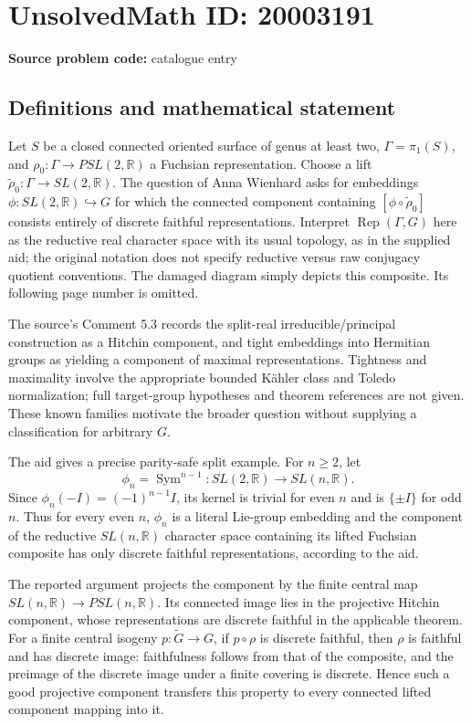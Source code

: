 \documentclass[11pt]{article}
\newcommand{\R}{\mathbb{R}}
\begin{document}
\section*{UnsolvedMath ID: 20003191}
\textbf{Source problem code:} catalogue entry
\subsection{Definitions and mathematical statement}
Let \(S\) be a closed connected oriented surface of genus at least two, \(\Gamma=\pi_1(S)\), and \(\rho_0:\Gamma\to PSL(2,\R)\) a Fuchsian representation. Choose a lift \(\widetilde\rho_0:\Gamma\to SL(2,\R)\). The question of Anna Wienhard asks for embeddings \(\phi:SL(2,\R)\hookrightarrow G\) for which the connected component containing \([\phi\circ\widetilde\rho_0]\) consists entirely of discrete faithful representations. Interpret \(\operatorname{Rep}(\Gamma,G)\) here as the reductive real character space with its usual topology, as in the supplied aid; the original notation does not specify reductive versus raw conjugacy quotient conventions. The damaged diagram simply depicts this composite. Its following page number is omitted.

The source's Comment 5.3 records the split-real irreducible/principal construction as a Hitchin component, and tight embeddings into Hermitian groups as yielding a component of maximal representations. Tightness and maximality involve the appropriate bounded K\"ahler class and Toledo normalization; full target-group hypotheses and theorem references are not given. These known families motivate the broader question without supplying a classification for arbitrary \(G\).

The aid gives a precise parity-safe split example. For \(n\ge2\), let
\[
\phi_n=\operatorname{Sym}^{n-1}:SL(2,\R)\longrightarrow SL(n,\R).
\]
Since \(\phi_n(-I)=(-1)^{n-1}I\), its kernel is trivial for even \(n\) and is \(\{\pm I\}\) for odd \(n\). Thus for every even \(n\), \(\phi_n\) is a literal Lie-group embedding and the component of the reductive \(SL(n,\R)\) character space containing its lifted Fuchsian composite has only discrete faithful representations, according to the aid.

The reported argument projects the component by the finite central map \(SL(n,\R)\to PSL(n,\R)\). Its connected image lies in the projective Hitchin component, whose representations are discrete faithful in the applicable theorem. For a finite central isogeny \(p:\widetilde G\to G\), if \(p\circ\rho\) is discrete faithful, then \(\rho\) is faithful and has discrete image: faithfulness follows from that of the composite, and the preimage of the discrete image under a finite covering is discrete. Hence such a good projective component transfers this property to every connected lifted component mapping into it.
\end{document}
